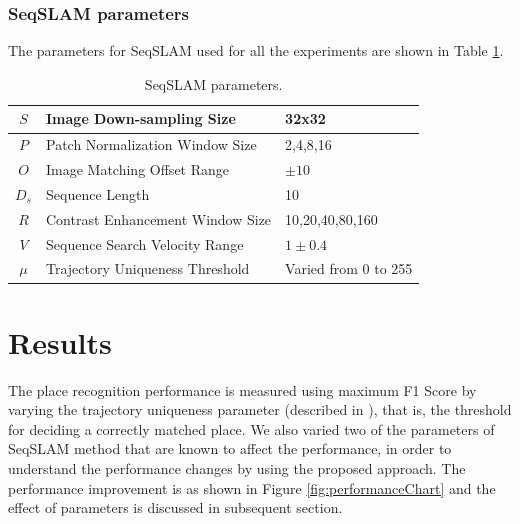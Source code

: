 \documentclass[letterpaper, 10 pt, conference]{ieeeconf}  %
\begin{document}
\subsubsection{SeqSLAM parameters}
The parameters for SeqSLAM used for all the experiments are shown in Table \ref{table:seqSLAMParams}.

\begin{table}[!htbp]
\caption{SeqSLAM parameters.}
 \begin{tabular}{|c|p{4cm}|p{2.5cm}|}
 \hline
  $S$ & Image Down-sampling Size & 32x32 \\
  \hline
  $P$ & Patch Normalization Window Size & {2,4,8,16} \\
  \hline
  $O$ & Image Matching Offset Range & $\pm10$ \\
  \hline
  $D_s$ & Sequence Length & 10 \\
  \hline
  $R$ & Contrast Enhancement Window Size & {10,20,40,80,160} \\
  \hline
  $V$ & Sequence Search Velocity Range & $1\pm0.4$ \\
  \hline
  $\mu$ & Trajectory Uniqueness Threshold & Varied from 0 to 255 \\
 \hline
 \end{tabular}
\label{table:seqSLAMParams}
\end{table}

\section{Results}
The place recognition performance is measured using maximum F1 Score by varying the trajectory uniqueness parameter (described in \cite{Milford2012}), that is, the threshold for deciding a correctly matched place. We also varied two of the parameters of SeqSLAM method that are known to affect the performance, in order to understand the performance changes by using the proposed approach. The performance improvement is as shown in Figure \ref{fig:performanceChart} and the effect of parameters is discussed in subsequent section. 
\end{document}
